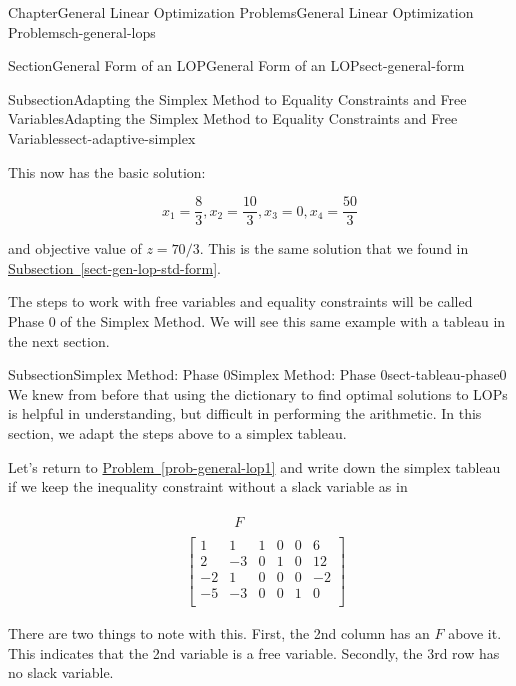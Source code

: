 \documentclass[oneside,10pt,]{book}
\newcommand{\xreffont}{\relax}
\numberwithin{equation}{section}
\newcommand{\amp}{&}
\begin{document}
\begin{chapterptx}{Chapter}{General Linear Optimization Problems}{}{General Linear Optimization Problems}{}{}{ch-general-lops}
\begin{sectionptx}{Section}{General Form of an LOP}{}{General Form of an LOP}{}{}{sect-general-form}
\begin{subsectionptx}{Subsection}{Adapting the Simplex Method to Equality Constraints and Free Variables}{}{Adapting the Simplex Method to Equality Constraints and Free Variables}{}{}{sect-adaptive-simplex}
\begin{equation*}
\end{equation*}
%
\par
This now has the basic solution:%
\par
%
\begin{equation*}
x_1 = \frac{8}{3}, x_2 = \frac{10}{3}, x_3 = 0, x_4 = \frac{50}{3}
\end{equation*}
%
\par
and objective value of \(z=70/3\). This is the same solution that we found in \hyperref[sect-gen-lop-std-form]{Subsection~{\xreffont\ref{sect-gen-lop-std-form}}}.%
\par
The steps to work with free variables and equality constraints will be called Phase 0 of the Simplex Method. We will see this same example with a tableau in the next section.%
\end{subsectionptx}
%
%
\typeout{************************************************}
\typeout{************************************************}
%
\begin{subsectionptx}{Subsection}{Simplex Method: Phase 0}{}{Simplex Method: Phase 0}{}{}{sect-tableau-phase0}
We knew from before that using the dictionary to find optimal solutions to LOPs is helpful in understanding, but difficult in performing the arithmetic. In this section, we adapt the steps above to a simplex tableau.%
\par
Let's return to \hyperref[prob-general-lop1]{Problem~{\xreffont\ref{prob-general-lop1}}} and write down the simplex tableau if we keep the inequality constraint without a slack variable as in%
\par
%
\begin{align*}
\amp\begin{array}{rrrrrr}\phantom{11}\amp\phantom{1}\amp F \end{array}\\
\amp\left[\begin{array}{rr|rrr|r} 1 \amp 1 \amp 1 \amp 0 \amp 0 \amp 6\\ 2 \amp -3 \amp 0 \amp 1 \amp 0 \amp 12\\ -2 \amp 1 \amp 0 \amp 0 \amp 0 \amp -2\\ \hline -5 \amp -3 \amp 0 \amp 0 \amp 1 \amp 0\\ \end{array} \right]
\end{align*}
%
\par
There are two things to note with this. First, the 2nd column has an \(F\) above it. This indicates that the 2nd variable is a free variable. Secondly, the 3rd row has no slack variable.%

\end{subsectionptx}
\end{sectionptx}
\end{chapterptx}
\end{document}
